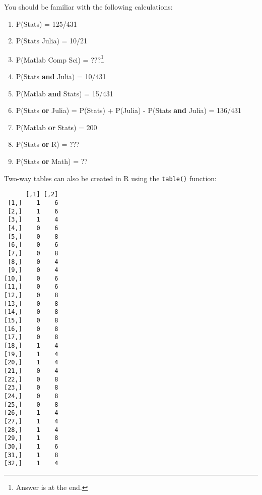 \documentclass[
  letterpaper,
  DIV=11,
  numbers=noendperiod]{scrreprt}
\newenvironment{Shaded}{\begin{snugshade}}{\end{snugshade}}
\newcommand{\CommentTok}[1]{\textcolor[rgb]{0.37,0.37,0.37}{#1}}
\newcommand{\FunctionTok}[1]{\textcolor[rgb]{0.28,0.35,0.67}{#1}}
\newcommand{\NormalTok}[1]{\textcolor[rgb]{0.00,0.23,0.31}{#1}}
\newcommand{\SpecialCharTok}[1]{\textcolor[rgb]{0.37,0.37,0.37}{#1}}
\providecommand{\tightlist}{%
  \setlength{\itemsep}{0pt}\setlength{\parskip}{0pt}}\usepackage{longtable,booktabs,array}
\begin{document}
You should be familiar with the following calculations:

\begin{enumerate}
\def\labelenumi{\arabic{enumi}.}
\tightlist
\item
  P(Stats) = 125/431
\item
  P(Stats \textbar{} Julia) = 10/21
\item
  P(Matlab \textbar{} Comp Sci) = ???\footnote{Answer is at the end.}
\item
  P(Stats \textbf{and} Julia) = 10/431
\item
  P(Matlab \textbf{and} Stats) = 15/431
\item
  P(Stats \textbf{or} Julia) = P(Stats) + P(Julia) - P(Stats
  \textbf{and} Julia) = 136/431
\item
  P(Matlab \textbf{or} Stats) = 200
\item
  P(Stats \textbf{or} R) = ???
\item
  P(Stats \textbf{or} Math) = ??
\end{enumerate}

Two-way tables can also be created in R using the \texttt{table()}
function:

\begin{Shaded}
\end{Shaded}

\begin{verbatim}
      [,1] [,2]
 [1,]    1    6
 [2,]    1    6
 [3,]    1    4
 [4,]    0    6
 [5,]    0    8
 [6,]    0    6
 [7,]    0    8
 [8,]    0    4
 [9,]    0    4
[10,]    0    6
[11,]    0    6
[12,]    0    8
[13,]    0    8
[14,]    0    8
[15,]    0    8
[16,]    0    8
[17,]    0    8
[18,]    1    4
[19,]    1    4
[20,]    1    4
[21,]    0    4
[22,]    0    8
[23,]    0    8
[24,]    0    8
[25,]    0    8
[26,]    1    4
[27,]    1    4
[28,]    1    4
[29,]    1    8
[30,]    1    6
[31,]    1    8
[32,]    1    4
\end{verbatim}

\begin{Shaded}
\end{Shaded}
\end{document}
